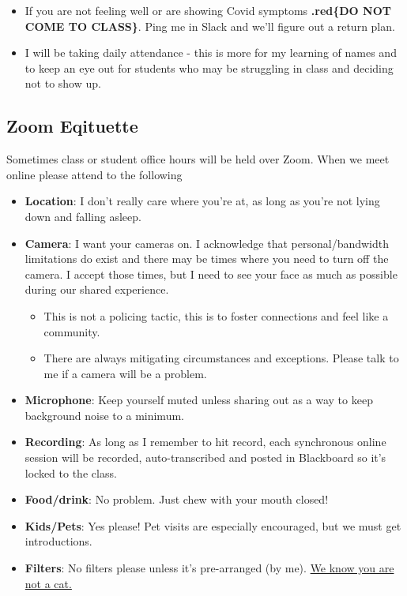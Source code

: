 \documentclass[
]{article}
\providecommand{\tightlist}{%
  \setlength{\itemsep}{0pt}\setlength{\parskip}{0pt}}
\begin{document}
\begin{itemize}
\tightlist
\item
  If you are not feeling well or are showing Covid symptoms
  \textbf{.red\{DO NOT COME TO CLASS\}}. Ping me in Slack and we'll
  figure out a return plan.
\item
  I will be taking daily attendance - this is more for my learning of
  names and to keep an eye out for students who may be struggling in
  class and deciding not to show up.
\end{itemize}

\hypertarget{zoom-eqituette}{%
\subsection{Zoom Eqituette}\label{zoom-eqituette}}

Sometimes class or student office hours will be held over Zoom. When we
meet online please attend to the following

\begin{itemize}
\tightlist
\item
  \textbf{Location}: I don't really care where you're at, as long as
  you're not lying down and falling asleep.
\item
  \textbf{Camera}: I want your cameras on. I acknowledge that
  personal/bandwidth limitations do exist and there may be times where
  you need to turn off the camera. I accept those times, but I need to
  see your face as much as possible during our shared experience.

  \begin{itemize}
  \tightlist
  \item
    This is not a policing tactic, this is to foster connections and
    feel like a community.
  \item
    There are always mitigating circumstances and exceptions. Please
    talk to me if a camera will be a problem.
  \end{itemize}
\item
  \textbf{Microphone}: Keep yourself muted unless sharing out as a way
  to keep background noise to a minimum.
\item
  \textbf{Recording}: As long as I remember to hit record, each
  synchronous online session will be recorded, auto-transcribed and
  posted in Blackboard so it's locked to the class.
\item
  \textbf{Food/drink}: No problem. Just chew with your mouth closed!
\item
  \textbf{Kids/Pets}: Yes please! Pet visits are especially encouraged,
  but we must get introductions.
\item
  \textbf{Filters}: No filters please unless it's pre-arranged (by me).
  \href{https://www.youtube.com/watch?v=lGOofzZOyl8}{We know you are not
  a cat.}
\end{itemize}
\end{document}
